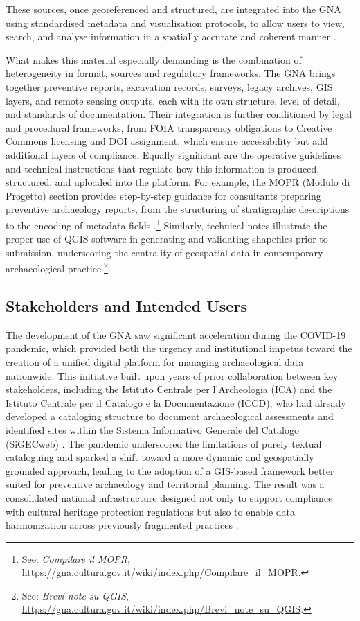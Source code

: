 \begin{spacing}{1.5}
\noindent These sources, once georeferenced and structured, are integrated into the GNA using standardised metadata and visualisation protocols, to allow users to view, search, and analyse information in a spatially accurate and coherent manner \citep{boi_il_2023, acconcia_pubblicazione_2023}.

What makes this material especially demanding is the combination of heterogeneity in format, sources and regulatory frameworks. The GNA brings together preventive reports, excavation records, surveys, legacy archives, GIS layers, and remote sensing outputs, each with its own structure, level of detail, and standards of documentation. Their integration is further conditioned by legal and procedural frameworks, from FOIA transparency obligations to Creative Commons licensing and DOI assignment, which ensure accessibility but add additional layers of compliance. Equally significant are the operative guidelines and technical instructions that regulate how this information is produced, structured, and uploaded into the platform. For example, the MOPR (Modulo di Progetto) section provides step-by-step guidance for consultants preparing preventive archaeology reports, from the structuring of stratigraphic descriptions to the encoding of metadata fields \parencite{noauthor_compilare_2025}.\footnote{See: \textit{Compilare il MOPR}, \url{https://gna.cultura.gov.it/wiki/index.php/Compilare_il_MOPR}.} Similarly, technical notes \parencite{noauthor_brevi_2025} illustrate the proper use of QGIS software in generating and validating shapefiles prior to submission, underscoring the centrality of geospatial data in contemporary archaeological practice.\footnote{See: \textit{Brevi note su QGIS}, \url{https://gna.cultura.gov.it/wiki/index.php/Brevi_note_su_QGIS}.}

\subsection{Stakeholders and Intended Users}\label{sec:gna_plugin}
The development of the GNA saw significant acceleration during the COVID-19 pandemic, which provided both the urgency and institutional impetus toward the creation of a unified digital platform for managing archaeological data nationwide. This initiative built upon years of prior collaboration between key stakeholders, including the Istituto Centrale per l’Archeologia (ICA) and the Istituto Centrale per il Catalogo e la Documentazione (ICCD), who had already developed a cataloging structure to document archaeological assessments and identified sites within the Sistema Informativo Generale del Catalogo (SiGECweb) \citep{calandra_il_2023, boi_il_2023}. The pandemic underscored the limitations of purely textual cataloguing and sparked a shift toward a more dynamic and geospatially grounded approach, leading to the adoption of a GIS-based framework better suited for preventive archaeology and territorial planning. The result was a consolidated national infrastructure designed not only to support compliance with cultural heritage protection regulations but also to enable data harmonization across previously fragmented practices \citep{acconcia_pubblicazione_2023}.


\end{spacing}
